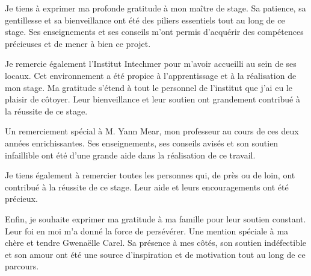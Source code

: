
Je tiens à exprimer ma profonde gratitude à mon maître de stage. Sa patience, sa gentillesse et sa bienveillance ont été des piliers essentiels tout au long de ce stage. Ses enseignements et ses conseils m'ont permis d'acquérir des compétences précieuses et de mener à bien ce projet.

Je remercie également l'Institut Intechmer pour m'avoir accueilli au sein de ses locaux. Cet environnement a été propice à l'apprentissage et à la réalisation de mon stage. Ma gratitude s'étend à tout le personnel de l'institut que j'ai eu le plaisir de côtoyer. Leur bienveillance et leur soutien ont grandement contribué à la réussite de ce stage.

Un remerciement spécial à M. Yann Mear, mon professeur au cours de ces deux années enrichissantes. Ses enseignements, ses conseils avisés et son soutien infaillible ont été d'une grande aide dans la réalisation de ce travail.

Je tiens également à remercier toutes les personnes qui, de près ou de loin, ont contribué à la réussite de ce stage. Leur aide et leurs encouragements ont été précieux.

Enfin, je souhaite exprimer ma gratitude à ma famille pour leur soutien constant. Leur foi en moi m'a donné la force de persévérer. Une mention spéciale à ma chère et tendre Gwenaëlle Carel. Sa présence à mes côtés, son soutien indéfectible et son amour ont été une source d'inspiration et de motivation tout au long de ce parcours.


